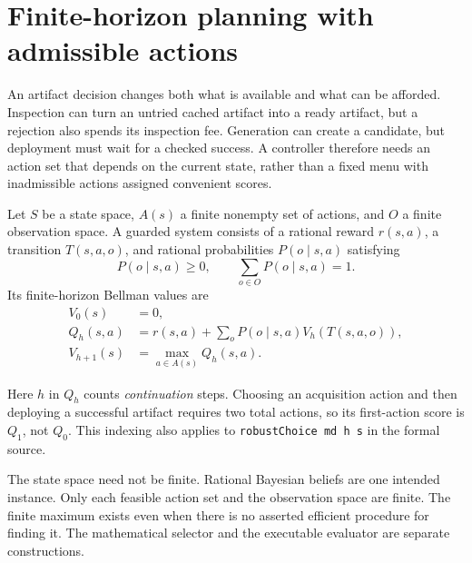 \section{Finite-horizon planning with admissible actions}
\label{sec:planning}

An artifact decision changes both what is available and what can be afforded.
Inspection can turn an untried cached artifact into a ready artifact, but a
rejection also spends its inspection fee. Generation can create a candidate,
but deployment must wait for a checked success. A controller therefore needs
an action set that depends on the current state, rather than a fixed menu with
inadmissible actions assigned convenient scores.

\begin{definition}
Let $S$ be a state space, $A(s)$ a finite nonempty set of actions, and $O$ a
finite observation space. A guarded system consists of a rational reward
$r(s,a)$, a transition $T(s,a,o)$, and rational probabilities $P(o\mid s,a)$
satisfying
\[
 P(o\mid s,a)\geq0,\qquad \sum_{o\in O}P(o\mid s,a)=1.
\]
Its finite-horizon Bellman values are
\begin{align}
 V_0(s)&=0,\label{eq:bellmanzero}\\
 Q_h(s,a)&=r(s,a)+\sum_oP(o\mid s,a)V_h(T(s,a,o)),\label{eq:qvalue}\\
 V_{h+1}(s)&=\max_{a\in A(s)}Q_h(s,a).\label{eq:bellman}
\end{align}
\end{definition}

Here $h$ in $Q_h$ counts \emph{continuation} steps. Choosing an acquisition
action and then deploying a successful artifact requires two total actions,
so its first-action score is $Q_1$, not $Q_0$. This indexing also applies to
\texttt{robustChoice md h s} in the formal source.

The state space need not be finite. Rational Bayesian beliefs are one intended
instance. Only each feasible action set and the observation space are finite.
The finite maximum exists even when there is no asserted efficient procedure
for finding it. The mathematical selector and the executable evaluator are
separate constructions.

